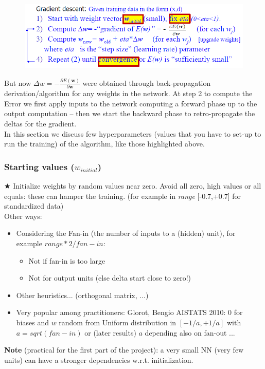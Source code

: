 \documentclass[../main.tex]{subfiles}
\begin{document}
\begin{figure}[H]
    \centering
    \includegraphics[scale = 0.6]{lectures/4_neural_networks/4_heu.png}
    \label{fig:4_heu}
\end{figure}
But now $\Delta w = -\frac{\partial E(\mathbf{w})}{\partial \mathbf{w}}$ were obtained through back-propagation derivation/algorithm for any weights in the network. At step 2 to compute the Error we first apply inputs to the network computing a forward phase up to the output computation
– then we start the backward phase to retro-propagate the deltas for the gradient.\\

\noindent In this section we discuss few hyperparameters (values that you have to set-up to run the training) of the algorithm, like those highlighted above.\\

\subsubsection{Starting values ($w_{initial}$)}
$\bigstar$ Initialize weights by random values near zero.
Avoid all zero, high values or all equals: these can hamper the training. (for example in \textit{range} [-0.7,+0.7] for standardized data)\\

Other ways:
\begin{itemize}
    \item Considering the Fan-in (the number of inputs to a (hidden) unit), for example $range * 2/fan-in$:
    \begin{itemize}
        \item Not if fan-in is too large
        \item Not for output units (else delta start close to zero!)
    \end{itemize}
    \item Other heuristics... (orthogonal matrix, ...)
    \item Very popular among practitioners: Glorot, Bengio AISTATS 2010:
    0 for biases and $w$ random from Uniform distribution in $[-1/a, +1/a]$ with $a=sqrt(fan-in)$ or (later results) $a$ depending also on fan-out ...
\end{itemize}
\textbf{Note} (practical for the first part of the project): a very small NN (very few units) can have a stronger dependencies w.r.t. initialization.
\end{document}
